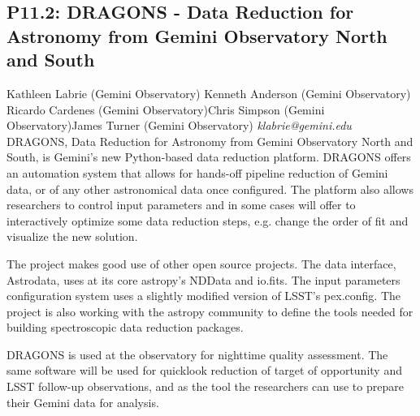 \documentclass{report}
\begin{document}
\subsection*{P11.2: DRAGONS - Data Reduction for Astronomy from Gemini Observatory North and South}
\bigskip
Kathleen Labrie (Gemini Observatory) \newline Kenneth Anderson (Gemini Observatory) \newline  Ricardo Cardenes (Gemini Observatory)\newline  Chris Simpson (Gemini Observatory)\newline James Turner (Gemini Observatory)\newline  \newline\newline
{\it klabrie@gemini.edu}\newline
\newline\newline
DRAGONS, Data Reduction for Astronomy from Gemini Observatory North and South, is Gemini’s new Python-based data reduction platform.  DRAGONS offers an automation system that allows for hands-off pipeline reduction of Gemini data, or of any other astronomical data once configured.  The platform also allows researchers to control input parameters and in some cases will offer to interactively optimize some data reduction steps, e.g. change the order of fit and visualize the new solution. 

The project makes good use of other open source projects.  The data interface, Astrodata, uses at its core astropy’s NDData and io.fits.  The input parameters configuration system uses a slightly modified version of LSST's pex.config.  The project is also working with the astropy community to define the tools needed for building spectroscopic data reduction packages.

DRAGONS is used at the observatory for nighttime quality assessment.  The same software will be used for quicklook reduction of target of opportunity and LSST follow-up observations, and as the tool the researchers can use to prepare their Gemini data for analysis.\newline
\newpage
\end{document}

